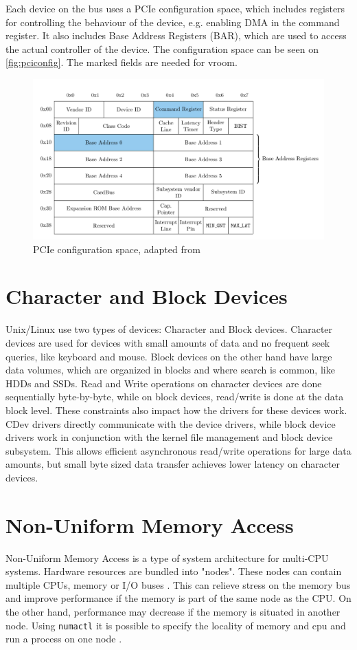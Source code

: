 Each device on the bus uses a PCIe configuration space, which includes registers for controlling the behaviour of the device, e.g. enabling DMA in the command register. It also includes Base Address Registers (BAR), which are used to access the actual controller of the device. The configuration space can be seen on \autoref{fig:pciconfig}. The marked fields are needed for vroom.

\begin{figure}[H]
    \centering
    \includegraphics[width=\textwidth]{figures/pcie-config-space}
    \caption{PCIe configuration space, adapted from \cite{vroom}}
    \label{fig:pciconfig}
\end{figure}

\section{Character and Block Devices}
Unix/Linux use two types of devices: Character and Block devices. Character devices are used for devices with small amounts of data and no frequent seek queries, like keyboard and mouse. Block devices on the other hand have large data volumes, which are organized in blocks and where search is common, like HDDs and SSDs.
Read and Write operations on character devices are done sequentially byte-by-byte, while on block devices, read/write is done at the data block level.
These constraints also impact how the drivers for these devices work. CDev drivers directly communicate with the device drivers, while block device drivers work in conjunction with the kernel file management and block device subsystem. This allows efficient asynchronous read/write operations for large data amounts, but small byte sized data transfer achieves lower latency on character devices.

\section{Non-Uniform Memory Access}
Non-Uniform Memory Access is a type of system architecture for multi-CPU systems. Hardware resources are bundled into "nodes". These nodes can contain multiple CPUs, memory or I/O buses \cite{numakerneldocs}. This can relieve stress on the memory bus and improve performance if the memory is part of the same node as the CPU. On the other hand, performance may decrease if the memory is situated in another node. Using \texttt{numactl} it is possible to specify the locality of memory and cpu and run a process on one node \cite{numactlmanpage}.

